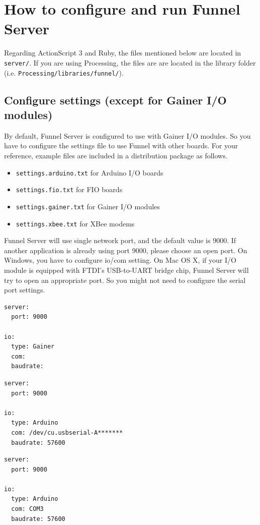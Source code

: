 \documentclass[9pt]{jsarticle}
\begin{document}
\clearpage
\section{How to configure and run Funnel Server}
Regarding ActionScript 3 and Ruby, the files mentioned below are located in \texttt{server/}. If you are using Processing, the files are are located in the library folder (i.e. \texttt{Processing/libraries/funnel/}). 

\subsection{Configure settings (except for Gainer I/O modules)}
By default, Funnel Server is configured to use with Gainer I/O modules. So you have to configure the settings file to use Funnel with other boards. For your reference, example files are included in a distribution package as follows.
\begin{itemize}
\item \texttt{settings.arduino.txt} for Arduino I/O boards
\item \texttt{settings.fio.txt} for FIO boards
\item \texttt{settings.gainer.txt} for Gainer I/O modules
\item \texttt{settings.xbee.txt} for XBee modems
\end{itemize}
Funnel Server will use single network port, and the default value is 9000. If another application is already using port 9000, please choose an open port. On Windows, you have to configure io/com setting. On Mac OS X, if your I/O module is equipped with FTDI's USB-to-UART bridge chip, Funnel Server will try to open an appropriate port. So you might not need to configure the serial port settings.

\begin{lstlisting}[caption={An example of settings.txt for Gainer I/O modules},label=useless]
server:
  port: 9000

io:
  type: Gainer
  com: 
  baudrate: 
\end{lstlisting}

\begin{lstlisting}[caption={An example of settings.txt for Arduino I/O boards (Mac OS X)},label=useless]
server:
  port: 9000

io:
  type: Arduino
  com: /dev/cu.usbserial-A*******
  baudrate: 57600
\end{lstlisting}

\begin{lstlisting}[caption={An example of settings.txt for Arduino I/O boards (Windows)},label=useless]
server:
  port: 9000

io:
  type: Arduino
  com: COM3
  baudrate: 57600
\end{lstlisting}
\end{document}

